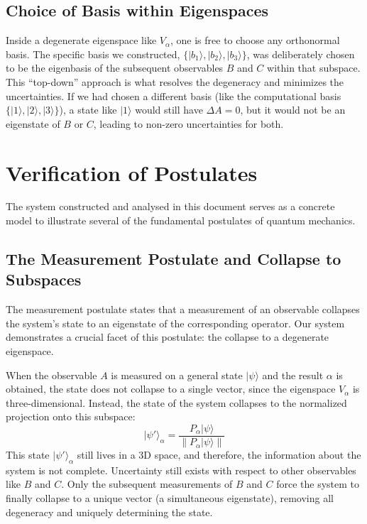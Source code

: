\documentclass[11pt,a4paper]{article}
\begin{document}
  \subsection{Choice of Basis within Eigenspaces}
  Inside a degenerate eigenspace like $V_{\alpha}$, one is free to choose any
  orthonormal basis. The specific basis we constructed, $\{|b_1\rangle,
  |b_2\rangle, |b_3\rangle\}$, was deliberately chosen to be the eigenbasis of
  the subsequent observables $B$ and $C$ within that subspace. This ``top-down''
  approach is what resolves the degeneracy and minimizes the uncertainties. If
  we had chosen a different basis (like the computational basis $\{|1\rangle,
  |2\rangle, |3\rangle\}$), a state like $|1\rangle$ would still have $\Delta A
  = 0$, but it would not be an eigenstate of $B$ or $C$, leading to non-zero
  uncertainties for both.

  \section{Verification of Postulates}
  The system constructed and analysed in this document serves as a concrete
  model to illustrate several of the fundamental postulates of quantum
  mechanics.

  \subsection{The Measurement Postulate and Collapse to Subspaces}
  The measurement postulate states that a measurement of an observable collapses
  the system's state to an eigenstate of the corresponding operator. Our system
  demonstrates a crucial facet of this postulate: the collapse to a
  degenerate eigenspace.

  When the observable $A$ is measured on a general state $|\psi\rangle$ and the
  result $\alpha$ is obtained, the state does not collapse to a single vector,
  since the eigenspace $V_{\alpha}$ is three-dimensional. Instead, the state of
  the system collapses to the normalized projection onto this subspace:
  \begin{equation*}
    |\psi'\rangle_{\alpha} = \frac{P_{\alpha}|\psi\rangle}{\|P_{\alpha}|\psi\rangle\|}
  \end{equation*}
  This state $|\psi'\rangle_{\alpha}$ still lives in a 3D space, and therefore,
  the information about the system is not complete. Uncertainty still exists
  with respect to other observables like $B$ and $C$. Only the subsequent
  measurements of $B$ and $C$ force the system to finally collapse to a unique
  vector (a simultaneous eigenstate), removing all degeneracy and uniquely
  determining the state.
\end{document}
